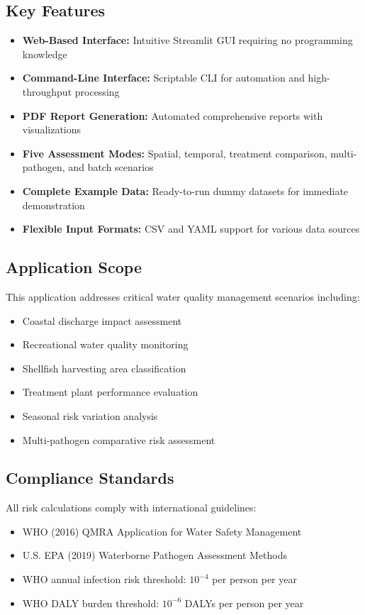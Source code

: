 \documentclass[11pt,a4paper]{article}
\begin{document}
\subsection{Key Features}

\begin{itemize}[leftmargin=*]
    \item \textbf{Web-Based Interface:} Intuitive Streamlit GUI requiring no programming knowledge
    \item \textbf{Command-Line Interface:} Scriptable CLI for automation and high-throughput processing
    \item \textbf{PDF Report Generation:} Automated comprehensive reports with visualizations
    \item \textbf{Five Assessment Modes:} Spatial, temporal, treatment comparison, multi-pathogen, and batch scenarios
    \item \textbf{Complete Example Data:} Ready-to-run dummy datasets for immediate demonstration
    \item \textbf{Flexible Input Formats:} CSV and YAML support for various data sources
\end{itemize}

\subsection{Application Scope}

This application addresses critical water quality management scenarios including:
\begin{itemize}[leftmargin=*]
    \item Coastal discharge impact assessment
    \item Recreational water quality monitoring
    \item Shellfish harvesting area classification
    \item Treatment plant performance evaluation
    \item Seasonal risk variation analysis
    \item Multi-pathogen comparative risk assessment
\end{itemize}

\subsection{Compliance Standards}

All risk calculations comply with international guidelines:
\begin{itemize}[leftmargin=*]
    \item WHO (2016) QMRA Application for Water Safety Management
    \item U.S. EPA (2019) Waterborne Pathogen Assessment Methods
    \item WHO annual infection risk threshold: $10^{-4}$ per person per year
    \item WHO DALY burden threshold: $10^{-6}$ DALYs per person per year
\end{itemize}
\end{document}
